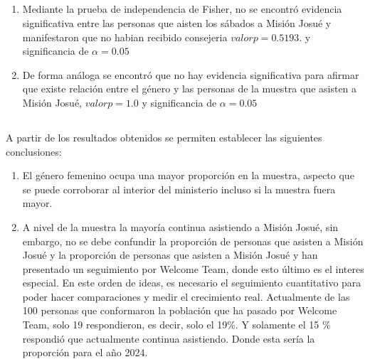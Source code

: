 \documentclass{beamer}
\begin{document}
\subsection{}
\begin{frame}{}
\vspace{-0.9\baselineskip}
\begin{tcolorbox}[colback=backframe_color,colframe=beamer_color,title= Pruebas de hipótesis] 


\begin{enumerate}
    \item Mediante la prueba de independencia de Fisher, no se encontró evidencia significativa entre las personas que aisten los sábados a Misión Josué y manifestaron que no habian recibido consejeria $valorp= 0.5193.$ y significancia de $\alpha = 0.05$
    \item De forma análoga se encontró que no hay evidencia significativa para afirmar que existe relación entre el género y las personas de la muestra que asisten a Misión Josué, $valor p=1.0$ y significancia de $\alpha = 0.05$
\end{enumerate}
\end{tcolorbox}
\end{frame}

\subsection{}
\begin{frame}{}
\vspace{-0.9\baselineskip}
\begin{tcolorbox}[colback=backframe_color,colframe=beamer_color,title= Conclusiones] 
A partir de los resultados obtenidos se permiten establecer las siguientes conclusiones:

\begin{enumerate}
    \item El género femenino ocupa una mayor proporción en la muestra, aspecto que se puede corroborar al interior del ministerio incluso si la muestra fuera mayor. 
    \item A nivel de la muestra la mayoría continua asistiendo a Misión Josué, sin embargo, no se debe confundir la proporción de personas que asisten a Misión Josué y la proporción de personas que asisten a Misión Josué y han presentado un seguimiento por Welcome Team, donde esto último es el interes especial. En este orden de ideas, es necesario el seguimiento cuantitativo para poder hacer comparaciones y medir el crecimiento real. Actualmente de las 100 personas que conformaron la población que ha pasado por Welcome Team, solo 19 respondieron, es decir, solo el 19\%. Y solamente el 15 \% respondió que actualmente continua asistiendo. Donde esta sería la proporción para el año 2024. 
\end{enumerate}
\end{tcolorbox}
\end{frame}
\end{document}
